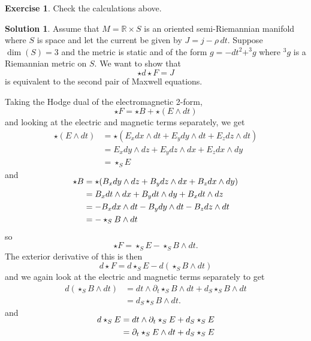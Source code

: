\documentclass[11pt, a4paper]{article}
\theoremstyle{definition}
\newtheorem{ex}{Exercise}[part]
\newtheorem{sol}{Solution}[part]
\begin{document}
\begin{ex}

Check the calculations above.

\end{ex}

\begin{sol}

Assume that $M = \mathbb{R} \times S$ is an oriented semi-Riemannian manifold where $S$ is space and let the current be given by $J = j - \rho \, dt$. Suppose $\dim(S) = 3$ and the metric is static and of the form $g = -dt^2 + ^3 g$ where $^3 g$ is a Riemannian metric on $S$. We want to show that
\[
    \star d \star F = J
\]
is equivalent to the second pair of Maxwell equations.

Taking the Hodge dual of the electromagnetic 2-form,
\[
    \star F = \star B + \star (E \wedge dt)
\]
and looking at the electric and magnetic terms separately, we get
\begin{align*}
    \star (E \wedge dt) &= \star (E_x dx \wedge dt + E_y dy \wedge dt + E_z dz \wedge dt) \\
        &= E_x dy \wedge dz + E_y dz \wedge dx + E_z dx \wedge dy \\
        &= \star_S E
\end{align*}
and
\begin{align*}
    \SwapAboveDisplaySkip
    \star B &= \star (B_x dy \wedge dz + B_y dz \wedge dx + B_z dx \wedge dy) \\
            &= B_x dt \wedge dx + B_y dt \wedge dy + B_x dt \wedge dz \\
            &= - B_x dx \wedge dt - B_y dy \wedge dt - B_z dz \wedge dt \\
            &= - \star_S B \wedge dt
\end{align*}
so
\[
    \star F = \star_S E - \star_S B \wedge dt.
\]
The exterior derivative of this is then
\[
    d \star F = d \star_S E - d (\star_S B \wedge dt)
\]
and we again look at the electric and magnetic terms separately to get
\begin{align*}
     d (\star_S B \wedge dt) &= dt \wedge \partial_t \star_S B \wedge dt + d_S \star_S B \wedge dt \\
        &= d_S \star_S B \wedge dt.
\end{align*}
and
\begin{align*}
    \SwapAboveDisplaySkip
    d \star_S E &= dt \wedge \partial_t \star_S E + d_S \star_S E \\
        &= \partial_t \star_S E \wedge dt + d_S \star_S E \\

\end{align*}
\end{sol}
\end{document}
